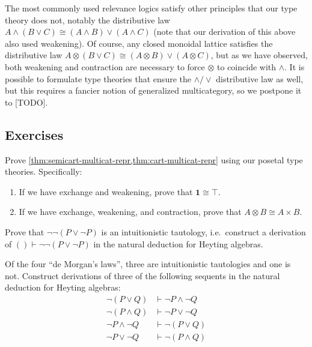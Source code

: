 \documentclass{book}
\let\types\vdash
\let\meet\wedge
\let\join\vee
\def\unit{\top}%
\def\one{\mathbf{1}}
\let\tensor\otimes
\begin{document}
The most commonly used relevance logics satisfy other principles that our type theory does not, notably the distributive law $A\meet (B\join C) \cong (A\meet B)\join (A\meet C)$ (note that our derivation of this above also used weakening).
Of course, any closed monoidal lattice satisfies the distributive law $A\tensor (B\join C) \cong (A\tensor B)\join (A\tensor C)$, but as we have observed, both weakening and contraction are necessary to force $\tensor$ to coincide with $\meet$.
It is possible to formulate type theories that ensure the $\meet/\join$ distributive law as well, but this requires a fancier notion of generalized multicategory, so we postpone it to [TODO].


\subsection*{Exercises}

\begin{ex}\label{ex:cart-typetheory}
  Prove \cref{thm:semicart-multicat-repr,thm:cart-multicat-repr} using our posetal type theories.
  Specifically:
  \begin{enumerate}
  \item If we have exchange and weakening, prove that $\one \cong \unit$.
  \item If we have exchange, weakening, and contraction, prove that $A\tensor B \cong A\times B$.
  \end{enumerate}
\end{ex}

\begin{ex}\label{ex:nnlem}
  Prove that $\neg\neg(P\join\neg P)$ is an intuitionistic tautology, i.e.\ construct a derivation of $()\types\neg\neg(P\join\neg P)$ in the natural deduction for Heyting algebras.
\end{ex}

\begin{ex}\label{ex:demorgan}
  Of the four ``de Morgan's laws'', three are intuitionistic tautologies and one is not.
  Construct derivations of three of the following sequents in the natural deduction for Heyting algebras:
  \begin{align*}
    \neg(P\join Q) &\types \neg P \meet \neg Q\\
    \neg(P\meet Q) &\types \neg P \join \neg Q\\
    \neg P \meet \neg Q &\types \neg(P\join Q)\\
    \neg P \join \neg Q &\types \neg(P\meet Q)
  \end{align*}
\end{ex}
\end{document}

